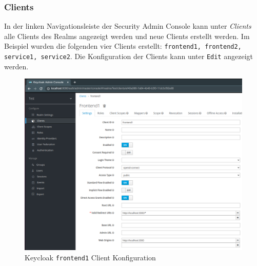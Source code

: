 \subsubsection{Clients}

In der linken Navigationsleiste der Security Admin Console kann unter \textit{Clients} alle Clients des Realms angezeigt werden und neue Clients erstellt werden. Im Beispiel wurden die folgenden vier Clients erstellt: \texttt{frontend1, frontend2, service1, service2}. Die Konfiguration der Clients kann unter \texttt{Edit} angezeigt werden.

\begin{figure}[!ht]
	\centering
	\includegraphics[width=1\textwidth]{Images/EbertScherer/KeycloakClientConfig.PNG}
	\caption{Keycloak \texttt{frontend1} Client Konfiguration}
	\label{fig:EB_Keycloak frontend1 Client Konfiguration}
\end{figure}

